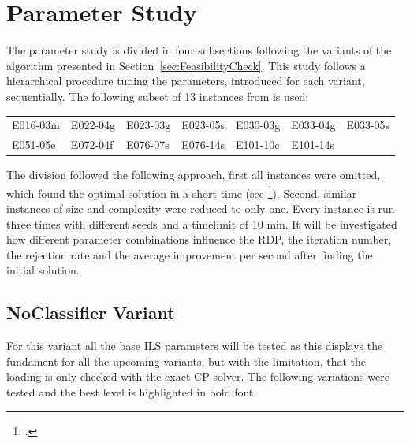 \section{Parameter Study}
\label{sec:parameter_study}

The parameter study is divided in four subsections following the variants of the algorithm
presented in Section~\ref{sec:FeasibilityCheck}. This study follows a hierarchical procedure
tuning the parameters, introduced for each variant, sequentially. The following subset of 13
instances from \gendreauDataSetText is used:


\begin{table}[ht]
    \centering
    \setlength{\tabcolsep}{0.75em}
    \def\arraystretch{1.5}
    \begin{tabular}{lllllll}
        E016-03m & E022-04g & E023-03g & E023-05s & E030-03g & E033-04g & E033-05s \\
        E051-05e & E072-04f & E076-07s & E076-14s & E101-10c & E101-14s &          \\
    \end{tabular}
\end{table}

The division followed the following approach, first all instances were omitted, which found
the optimal solution in a short time (see \cite{tamke_branch-and-cut_2024}\footcite[cf.][p.26]{tamke_branch-and-cut_2024}). Second, similar instances of size and complexity were reduced to only one.
Every instance is run three times with different seeds and a timelimit of 10 min. It will be investigated
how different parameter combinations influence the \gls{RDP}, the iteration number, the rejection rate and
the average improvement per second after finding the initial solution.

\subsection{NoClassifier Variant}
\label{subsec_parameterStuy_noclassifier}
For this variant all the base \gls{ILS} parameters will be tested as this displays the fundament
for all the upcoming variants, but with the limitation, that the loading is only checked
with the exact \gls{CP} solver. The following variations were tested and the best level is highlighted
in bold font.

